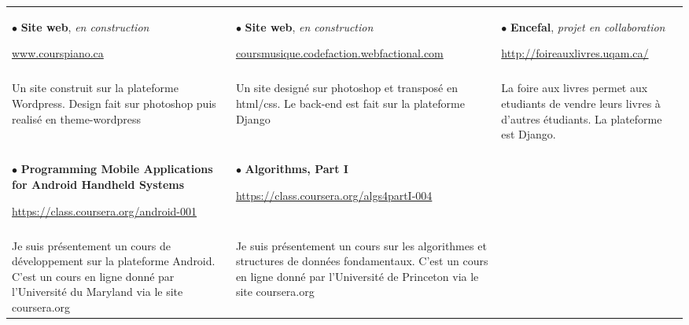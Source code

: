 \documentclass[a4paper,9pt]{extarticle}
\begin{document}
\begin{tabular*}{\linewidth}{  
                   p{ } 
                   p{ }  
                   p{ } 
                   } 
$\bullet$ \textbf{Site web}, \textsl{en construction} \par  \href{www.courspiano.ca}{www.courspiano.ca} 

&$\bullet$ \textbf{Site web}, \textsl{en construction} \par \small\href{http://coursmusique.codefaction.webfactional.com}{coursmusique.codefaction.webfactional.com}
&$\bullet$ \textbf{Encefal}, \textsl{projet en collaboration} \par \href{http://foireauxlivres.uqam.ca/}{http://foireauxlivres.uqam.ca/} \tabularnewline \\


\vspace{-1.4em}Un site construit sur la plateforme Wordpress. Design fait sur photoshop puis realisé en theme-wordpress
& \vspace{-1.5em} Un site designé sur photoshop et transposé en html/css. Le back-end est fait sur la plateforme Django  
&\vspace{-1.5em} La foire aux livres permet aux etudiants de vendre leurs livres à d'autres étudiants. La plateforme est Django. 
\tabularnewline \\

$\bullet$ \textbf{Programming Mobile Applications for Android Handheld Systems} \par \small \href{https://class.coursera.org/android-001}{https://class.coursera.org/android-001}


&$\bullet$ \textbf{Algorithms, Part I} \par \small \href{https://class.coursera.org/algs4partI-004}{https://class.coursera.org/algs4partI-004} 


& \tabularnewline \\
\vspace{-1.5em} Je suis présentement un cours de développement sur la plateforme Android. C'est un cours en ligne donné par l'Université du Maryland via le site coursera.org

& \vspace{-1.5em} Je suis présentement un cours sur les algorithmes et structures de données fondamentaux. C'est un cours en ligne donné par l'Université de Princeton via le site coursera.org



\end{tabular*}   
\end{document}
